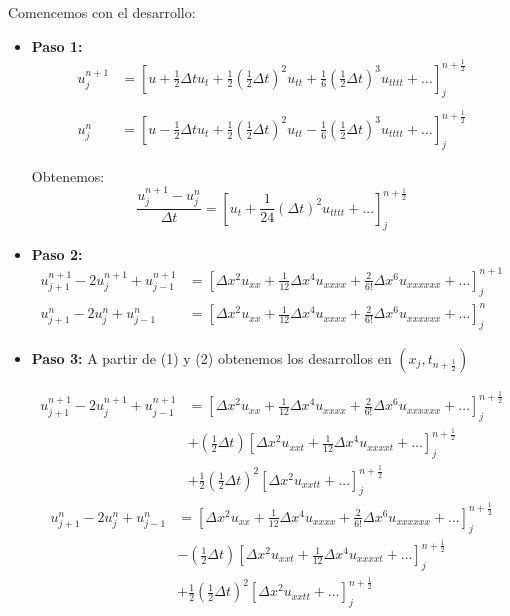 Comencemos con el desarrollo:
\begin{itemize}
	\item  \textbf{Paso 1:}
	\begin{align*}
	u_{j}^{n+1} & = \left[u + \frac{1}{2}\Delta tu_t + \frac{1}{2}\left(\frac{1}{2}\Delta t\right)^2u_{tt} + \frac{1}{6}\left(\frac{1}{2}\Delta t\right)^3u_{tttt} + \hdots \right]_j^{n+\frac{1}{2}}\\\\
	u_{j}^{n} & = \left[u - \frac{1}{2}\Delta tu_t + \frac{1}{2}\left(\frac{1}{2}\Delta t\right)^2u_{tt} - \frac{1}{6}\left(\frac{1}{2}\Delta t\right)^3u_{tttt} + \hdots \right]_j^{n+\frac{1}{2}}
	\end{align*}
	
	Obtenemos:	
	$$\frac{u_j^{n+1}-u_j^n}{\Delta t} = \left[u_t+\frac{1}{24}(\Delta t)^2u_{tttt}+\hdots \right]_j^{n+\frac{1}{2}}$$
	
	\item \textbf{Paso 2:}
	\begin{align*}
	u_{j+1}^{n+1} -2u_{j}^{n+1} + u_{j-1}^{n+1} & = \left[\Delta x ^2 u_{xx} + \frac{1}{12}\Delta x ^4 u_{xxxx} + \frac{2}{6!}\Delta x ^6 u_{xxxxxx}+\hdots \right]_j^{n+1}\\
	u_{j+1}^{n} -2u_{j}^{n} + u_{j-1}^{n} & = \left[\Delta x ^2 u_{xx} + \frac{1}{12}\Delta x ^4 u_{xxxx} + \frac{2}{6!}\Delta x ^6 u_{xxxxxx}+\hdots \right]_j^{n}
	\end{align*}
	\item \textbf{Paso 3:} A partir de (1) y (2) obtenemos los desarrollos en $(x_j, t_{n+\frac{1}{2}})$
	
	\begin{align*}
		u_{j+1}^{n+1} -2u_{j}^{n+1} + u_{j-1}^{n+1} & = \left[\Delta x ^2 u_{xx} + \frac{1}{12}\Delta x ^4 u_{xxxx} + \frac{2}{6!}\Delta x^6 u_{xxxxxx}+\hdots \right]_j^{n+\frac{1}{2}}\\
		& + \left(\frac{1}{2}\Delta t\right) \left[\Delta x ^2 u_{xxt} + \frac{1}{12}\Delta x ^4 u_{xxxxt} +\hdots \right]_j^{n+\frac{1}{2}}\\
		& + \frac{1}{2}\left(\frac{1}{2}\Delta t\right)^2 \left[\Delta x ^2 u_{xxtt} + \hdots \right]_j^{n+\frac{1}{2}}
	\end{align*}
	\begin{align*}
		u_{j+1}^{n} -2u_{j}^{n} + u_{j-1}^{n} & = \left[\Delta x ^2 u_{xx} + \frac{1}{12}\Delta x ^4 u_{xxxx} + \frac{2}{6!}\Delta x^6 u_{xxxxxx}+\hdots \right]_j^{n+\frac{1}{2}}\\
		& - \left(\frac{1}{2}\Delta t\right) \left[\Delta x ^2 u_{xxt} + \frac{1}{12}\Delta x ^4 u_{xxxxt} +\hdots \right]_j^{n+\frac{1}{2}}\\
		& + \frac{1}{2}\left(\frac{1}{2}\Delta t\right)^2 \left[\Delta x ^2 u_{xxtt} + \hdots \right]_j^{n+\frac{1}{2}}
	\end{align*}


\end{itemize}
